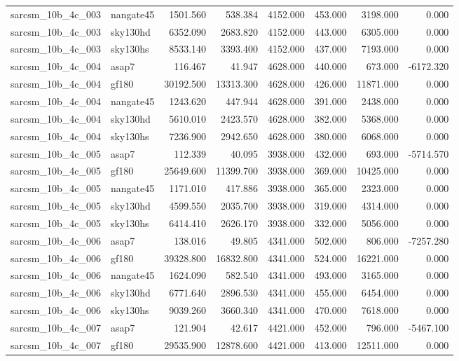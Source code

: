 \begin{tabular}{llrrrrrr}
sarcsm\_10b\_4c\_003 & nangate45 & 1501.560 & 538.384 & 4152.000 & 453.000 & 3198.000 & 0.000 \\
sarcsm\_10b\_4c\_003 & sky130hd & 6352.090 & 2683.820 & 4152.000 & 443.000 & 6305.000 & 0.000 \\
sarcsm\_10b\_4c\_003 & sky130hs & 8533.140 & 3393.400 & 4152.000 & 437.000 & 7193.000 & 0.000 \\
sarcsm\_10b\_4c\_004 & asap7 & 116.467 & 41.947 & 4628.000 & 440.000 & 673.000 & -6172.320 \\
sarcsm\_10b\_4c\_004 & gf180 & 30192.500 & 13313.300 & 4628.000 & 426.000 & 11871.000 & 0.000 \\
sarcsm\_10b\_4c\_004 & nangate45 & 1243.620 & 447.944 & 4628.000 & 391.000 & 2438.000 & 0.000 \\
sarcsm\_10b\_4c\_004 & sky130hd & 5610.010 & 2423.570 & 4628.000 & 382.000 & 5368.000 & 0.000 \\
sarcsm\_10b\_4c\_004 & sky130hs & 7236.900 & 2942.650 & 4628.000 & 380.000 & 6068.000 & 0.000 \\
sarcsm\_10b\_4c\_005 & asap7 & 112.339 & 40.095 & 3938.000 & 432.000 & 693.000 & -5714.570 \\
sarcsm\_10b\_4c\_005 & gf180 & 25649.600 & 11399.700 & 3938.000 & 369.000 & 10425.000 & 0.000 \\
sarcsm\_10b\_4c\_005 & nangate45 & 1171.010 & 417.886 & 3938.000 & 365.000 & 2323.000 & 0.000 \\
sarcsm\_10b\_4c\_005 & sky130hd & 4599.550 & 2035.700 & 3938.000 & 319.000 & 4314.000 & 0.000 \\
sarcsm\_10b\_4c\_005 & sky130hs & 6414.410 & 2626.170 & 3938.000 & 332.000 & 5056.000 & 0.000 \\
sarcsm\_10b\_4c\_006 & asap7 & 138.016 & 49.805 & 4341.000 & 502.000 & 806.000 & -7257.280 \\
sarcsm\_10b\_4c\_006 & gf180 & 39328.800 & 16832.800 & 4341.000 & 524.000 & 16221.000 & 0.000 \\
sarcsm\_10b\_4c\_006 & nangate45 & 1624.090 & 582.540 & 4341.000 & 493.000 & 3165.000 & 0.000 \\
sarcsm\_10b\_4c\_006 & sky130hd & 6771.640 & 2896.530 & 4341.000 & 455.000 & 6454.000 & 0.000 \\
sarcsm\_10b\_4c\_006 & sky130hs & 9039.260 & 3660.340 & 4341.000 & 470.000 & 7618.000 & 0.000 \\
sarcsm\_10b\_4c\_007 & asap7 & 121.904 & 42.617 & 4421.000 & 452.000 & 796.000 & -5467.100 \\
sarcsm\_10b\_4c\_007 & gf180 & 29535.900 & 12878.600 & 4421.000 & 413.000 & 12511.000 & 0.000 \\

\end{tabular}
